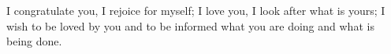 

 I congratulate you, I rejoice for myself; I love you, I look after what is yours; I wish to be loved by you and to be informed what you are doing and what is being done.
